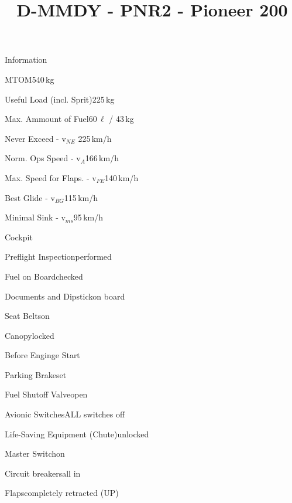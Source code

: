 \def\papersize{4}




\title{D-MMDY  -  PNR2  -  Pioneer 200}

\begin{checklist}{Information}
 	\item{MTOM}{540\,kg}
  	\item{Useful Load (incl. Sprit)}{225\,kg}
  	\item{Max. Ammount of Fuel}{60\,${\ell}$ / 43\,kg}
 	  \item{Never Exceed  -  v$_{NE}$ }{ 225\,km/h}
	  \item{Norm. Ops Speed  -  v$_{A}$}{166\,km/h}
	  \item{Max. Speed for Flaps.  -  v$_{FE}$}{140\,km/h}
	  \item{Best Glide  -  v$_{BG}$}{115\,km/h}
	  \item{Minimal Sink  -  v$_{ms}$}{95\,km/h}
\end{checklist}

\begin{checklist}{Cockpit}
	\item{Preflight Inspection}{performed}
	\item{Fuel on Board}{checked}
	\item{Documents and Dipstick}{on board}
	\item{Seat Belts}{on}
	\item{Canopy}{locked}
\end{checklist}

\begin{checklist}{Before Enginge Start}
	\item{Parking Brake}{set}
	\item{Fuel Shutoff Valve}{open}
	\item{Avionic Switches}{ALL switches off}
	\item{Life-Saving Equipment (Chute)}{unlocked}
	\item{Master Switch}{on}
	\item{Circuit breakers}{all in}
	\item{Flaps}{completely retracted (UP)}
\end{checklist}


